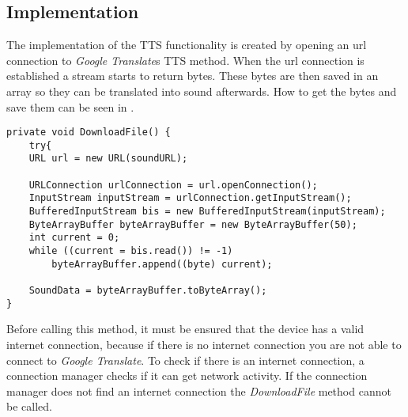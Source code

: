 \subsection{Implementation}
The implementation of the TTS functionality is created by opening an url connection to \textit{Google Translate}s TTS method.
When the url connection is established a stream starts to return bytes.
These bytes are then saved in an array so they can be translated into sound afterwards.
How to get the bytes and save them can be seen in .

\begin{lstlisting}[caption={Download Sound event},label={lst:download-sound}]
private void DownloadFile() {
    try{
    URL url = new URL(soundURL);

    URLConnection urlConnection = url.openConnection();
    InputStream inputStream = urlConnection.getInputStream();
    BufferedInputStream bis = new BufferedInputStream(inputStream);
    ByteArrayBuffer byteArrayBuffer = new ByteArrayBuffer(50);
    int current = 0;
    while ((current = bis.read()) != -1)
        byteArrayBuffer.append((byte) current);

    SoundData = byteArrayBuffer.toByteArray();
}
\end{lstlisting} 

Before calling this method, it must be ensured that the device has a valid internet connection, because if there is no internet connection you are not able to connect to \textit{Google Translate}.
To check if there is an internet connection, a connection manager checks if it can get network activity.
If the connection manager does not find an internet connection the \textit{DownloadFile} method cannot be called.